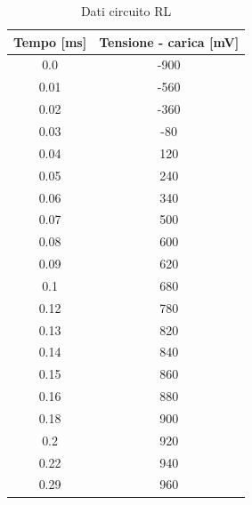 \documentclass[letterpaper,12pt]{article}
\begin{document}
\begin{table}[htbp]
    \centering
    \caption{Dati circuito RL}
    \begin{tabular}{cc}
        \toprule
        Tempo [ms] & Tensione - carica [mV] \\
        \midrule
        0.0 & -900 \\
        0.01 & -560 \\
        0.02 & -360 \\
        0.03 & -80 \\
        0.04 & 120 \\
        0.05 & 240 \\
        0.06 & 340 \\
        0.07 & 500 \\
        0.08 & 600 \\
        0.09 & 620 \\
        0.1 & 680 \\
        0.12 & 780 \\
        0.13 & 820 \\
        0.14 & 840 \\
        0.15 & 860 \\
        0.16 & 880 \\
        0.18 & 900 \\
        0.2 & 920 \\
        0.22 & 940 \\
        0.29 & 960 \\
        \bottomrule
    \end{tabular}
    \label{tab:dati_RL}
\end{table}
\end{document}
